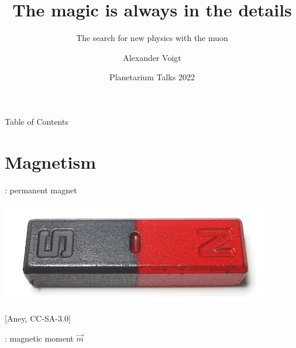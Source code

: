 \documentclass[12pt]{beamer}
\title{The magic is always in the details}
\subtitle{The search for new physics with the muon}
\author[Voigt]{Alexander Voigt}
\institute[HS Flensburg]{Hochschule Flensburg}
\date{Planetarium Talks 2022}
\newcommand{\magnet}[3]{%
    \def\lmag{#1}  %
    \def\wmag{#2}  %
    \def\nc{#3}    %
    \begin{scope}
      \coordinate (A) at (-\lmag/2,\wmag/2);
      \coordinate (B) at (\lmag/2,-\wmag/2);
      \draw[fill, color=green](A) rectangle ++(\lmag/2,-\wmag) node[black,midway]{S};
      \draw[fill, color=red](0,-\wmag/2) rectangle ++(\lmag/2,\wmag) node[black,midway]{N};
      \clip (-5,-3) rectangle (5,3);
      \foreach \r in {1,...,\nc}{
        \draw[fLines]($(A)-(0,0.5*\r*\wmag/\nc)$) arc(({270-asin(\lmag/(2*\r))}):({-90+asin(\lmag/(2*\r))}):\r);
        \draw[fLines]($(B)+(0,0.5*\r*\wmag/\nc)$) arc(({90-asin(\lmag/(2*\r))}):({-270+asin(\lmag/(2*\r))}):\r); }
      \draw[fLines] (-\lmag/2,0) -- ++(-6,0);
      \draw[fLines] (\lmag/2,0) ++(6,0)--(\lmag/2,0);
    \end{scope}
    \draw[blue,->,line width=3] (-\nc/8,2) -- ++(\nc/4,0) node[midway,above] {$\vec{m}$};
}
\begin{document}

\begin{frame}
  \titlepage
\end{frame}


\begin{frame}{Table of Contents}
  \tableofcontents
\end{frame}


\section{Magnetism}

\begin{frame}{\insertsection: permanent magnet}
  \begin{center}
    \includegraphics[width=0.9\textwidth]{img/bar_magnet_foto}

    \footnotesize [Aney, CC-SA-3.0]
  \end{center}
\end{frame}

\begin{frame}{\insertsection: magnetic moment $\vec{m}$}
\end{frame}

\end{document}
